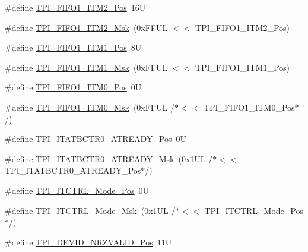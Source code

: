 \begin{DoxyCompactItemize}
\item 
\#define \hyperlink{group___c_m_s_i_s___t_p_i_ga1828c228f3940005f48fb8dd88ada35b}{T\+P\+I\+\_\+\+F\+I\+F\+O1\+\_\+\+I\+T\+M2\+\_\+\+Pos}~16U
\item 
\#define \hyperlink{group___c_m_s_i_s___t_p_i_gae54512f926ebc00f2e056232aa21d335}{T\+P\+I\+\_\+\+F\+I\+F\+O1\+\_\+\+I\+T\+M2\+\_\+\+Msk}~(0x\+F\+F\+U\+L $<$$<$ T\+P\+I\+\_\+\+F\+I\+F\+O1\+\_\+\+I\+T\+M2\+\_\+\+Pos)
\item 
\#define \hyperlink{group___c_m_s_i_s___t_p_i_gaece86ab513bc3d0e0a9dbd82258af49f}{T\+P\+I\+\_\+\+F\+I\+F\+O1\+\_\+\+I\+T\+M1\+\_\+\+Pos}~8U
\item 
\#define \hyperlink{group___c_m_s_i_s___t_p_i_ga3347f42828920dfe56e3130ad319a9e6}{T\+P\+I\+\_\+\+F\+I\+F\+O1\+\_\+\+I\+T\+M1\+\_\+\+Msk}~(0x\+F\+F\+U\+L $<$$<$ T\+P\+I\+\_\+\+F\+I\+F\+O1\+\_\+\+I\+T\+M1\+\_\+\+Pos)
\item 
\#define \hyperlink{group___c_m_s_i_s___t_p_i_ga2188671488417a52abb075bcd4d73440}{T\+P\+I\+\_\+\+F\+I\+F\+O1\+\_\+\+I\+T\+M0\+\_\+\+Pos}~0U
\item 
\#define \hyperlink{group___c_m_s_i_s___t_p_i_ga8ae09f544fc1a428797e2a150f14a4c9}{T\+P\+I\+\_\+\+F\+I\+F\+O1\+\_\+\+I\+T\+M0\+\_\+\+Msk}~(0x\+F\+F\+U\+L /$\ast$$<$$<$ T\+P\+I\+\_\+\+F\+I\+F\+O1\+\_\+\+I\+T\+M0\+\_\+\+Pos$\ast$/)
\item 
\#define \hyperlink{group___c_m_s_i_s___t_p_i_gab1eb6866c65f02fa9c83696b49b0f346}{T\+P\+I\+\_\+\+I\+T\+A\+T\+B\+C\+T\+R0\+\_\+\+A\+T\+R\+E\+A\+D\+Y\+\_\+\+Pos}~0U
\item 
\#define \hyperlink{group___c_m_s_i_s___t_p_i_gaee320b3c60f9575aa96a8742c4ff9356}{T\+P\+I\+\_\+\+I\+T\+A\+T\+B\+C\+T\+R0\+\_\+\+A\+T\+R\+E\+A\+D\+Y\+\_\+\+Msk}~(0x1\+U\+L /$\ast$$<$$<$ T\+P\+I\+\_\+\+I\+T\+A\+T\+B\+C\+T\+R0\+\_\+\+A\+T\+R\+E\+A\+D\+Y\+\_\+\+Pos$\ast$/)
\item 
\#define \hyperlink{group___c_m_s_i_s___t_p_i_gaa847adb71a1bc811d2e3190528f495f0}{T\+P\+I\+\_\+\+I\+T\+C\+T\+R\+L\+\_\+\+Mode\+\_\+\+Pos}~0U
\item 
\#define \hyperlink{group___c_m_s_i_s___t_p_i_gad6f87550b468ad0920d5f405bfd3f017}{T\+P\+I\+\_\+\+I\+T\+C\+T\+R\+L\+\_\+\+Mode\+\_\+\+Msk}~(0x1\+U\+L /$\ast$$<$$<$ T\+P\+I\+\_\+\+I\+T\+C\+T\+R\+L\+\_\+\+Mode\+\_\+\+Pos$\ast$/)
\item 
\#define \hyperlink{group___c_m_s_i_s___t_p_i_ga9f46cf1a1708575f56d6b827766277f4}{T\+P\+I\+\_\+\+D\+E\+V\+I\+D\+\_\+\+N\+R\+Z\+V\+A\+L\+I\+D\+\_\+\+Pos}~11U
\item 

\end{DoxyCompactItemize}
